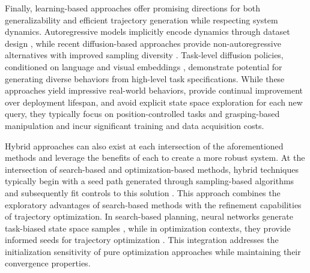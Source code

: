 
Finally, learning-based approaches offer promising directions for both generalizability and efficient trajectory generation while respecting system dynamics. Autoregressive models implicitly encode dynamics through dataset design \cite{fishman2023motion,qureshi2020motion}, while recent diffusion-based approaches provide non-autoregressive alternatives with improved sampling diversity \cite{carvalho2023motion,saha2024edmp}. Task-level diffusion policies, conditioned on language and visual embeddings \cite{ajay2023is,chi2023diffusionpolicy}, demonstrate potential for generating diverse behaviors from high-level task specifications.
While these approaches yield impressive real-world behaviors, provide continual improvement over deployment lifespan, and avoid explicit state space exploration for each new query, they typically focus on position-controlled tasks and grasping-based manipulation and incur significant training and data acquisition costs.



Hybrid approaches can also exist at each intersection of the aforementioned methods and leverage the benefits of each to create a more robust system.
At the intersection of search-based and optimization-based methods, hybrid techniques typically begin with a seed path generated through sampling-based algorithms and subsequently fit controls to this solution \cite{kuntz2019fast}. This approach combines the exploratory advantages of search-based methods with the refinement capabilities of trajectory optimization.
In search-based planning, neural networks generate task-biased state space samples \cite{mcmahon2022survey}, while in optimization contexts, they provide informed seeds for trajectory optimization \cite{ichnowski2020deep}. This integration addresses the initialization sensitivity of pure optimization approaches while maintaining their convergence properties.


